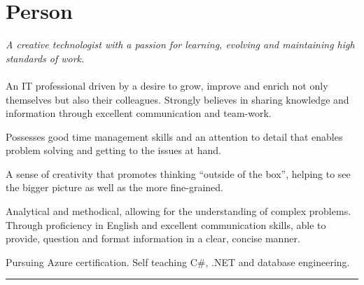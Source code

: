 \documentclass[10pt,a4paper]{article}
\begin{document}
{
	\fancyhf{}
	\setlength\headheight{43pt}
	\fancyfoot[CO]{}
}

\thispagestyle{firstpage}
\vspace*{-2.5em}

\section{Person}
\begin{multicols}{2}
    \noindent \small\emph{\color{gray}\small A creative technologist with a passion for learning, evolving and maintaining high standards of work.}\\\\
    \noindent An IT professional driven by a desire to grow, improve and enrich not only themselves but also their colleagues. Strongly believes in sharing knowledge and information through excellent communication and team-work.

    \noindent Possesses good time management skills and an attention to detail that enables problem solving and getting to the issues at hand.
    
    \noindent A sense of creativity that promotes thinking ``outside of the box'', helping to see the bigger picture as well as the more fine-grained.

    \noindent Analytical and methodical, allowing for the understanding of complex problems. Through proficiency in English and excellent communication skills, able to provide, question and format information in a clear, concise manner.

    \noindent Pursuing Azure certification. Self teaching C\#, .NET and database engineering.
\end{multicols}

\hrule
\vspace*{2em}
\end{document}
